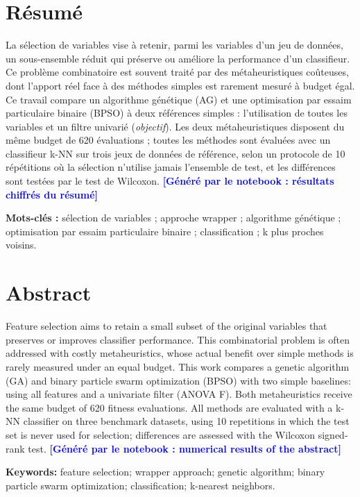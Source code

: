 \documentclass[11pt,a4paper]{report}
\newcommand{\attente}[1]{\textcolor{blue}{\textbf{[Généré par le notebook : #1]}}}
\newcommand{\ResumeChiffres}{\attente{résultats chiffrés du résumé}}
\newcommand{\AbstractNumbers}{\attente{numerical results of the abstract}}
\begin{document}
\chapter*{Résumé}
La sélection de variables vise à retenir, parmi les variables d'un jeu de données, un
sous-ensemble réduit qui préserve ou améliore la performance d'un classifieur.
Ce problème combinatoire est souvent traité par des métaheuristiques coûteuses, dont l'apport
réel face à des méthodes simples est rarement mesuré à budget égal. Ce
travail compare un algorithme génétique (AG) et une optimisation par essaim particulaire binaire
(BPSO) à deux références simples : l'utilisation de toutes les variables et un filtre univarié
(\emph{objectif}). Les deux métaheuristiques disposent du même budget de 620 évaluations ; toutes
les méthodes sont évaluées avec un classifieur k-NN sur trois jeux de données de référence, selon
un protocole de 10 répétitions où la sélection n'utilise jamais l'ensemble de test, et les
différences sont testées par le test de Wilcoxon.
\ResumeChiffres

\medskip
\noindent\textbf{Mots-clés :} sélection de variables ; approche wrapper ; algorithme génétique ;
optimisation par essaim particulaire binaire ; classification ; k plus proches voisins.

\chapter*{Abstract}
Feature selection aims to retain a small subset of the original variables that preserves or
improves classifier performance. This combinatorial problem is often addressed with costly
metaheuristics, whose actual benefit over simple methods is rarely measured under an equal
budget. This work compares a genetic algorithm (GA) and binary particle swarm optimization (BPSO)
with two simple baselines: using all features and a univariate filter (ANOVA F). Both
metaheuristics receive the same budget of 620 fitness evaluations. All methods are evaluated with
a k-NN classifier on three benchmark datasets, using 10 repetitions in which the test set is never
used for selection; differences are assessed with the Wilcoxon signed-rank test.
\AbstractNumbers

\medskip
\noindent\textbf{Keywords:} feature selection; wrapper approach; genetic algorithm; binary
particle swarm optimization; classification; k-nearest neighbors.
\end{document}
